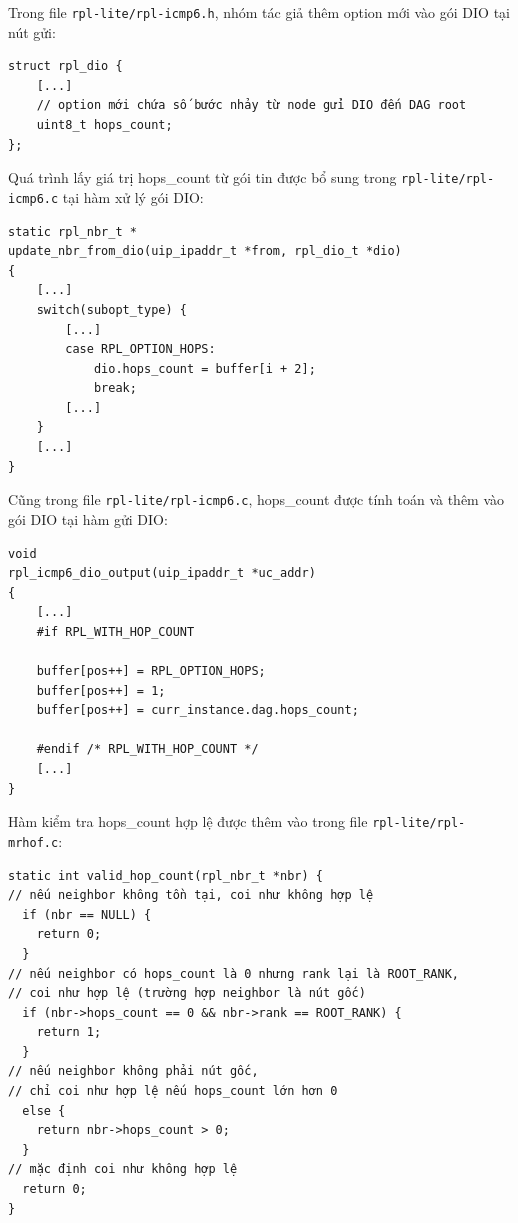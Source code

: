Trong file \texttt{rpl-lite/rpl-icmp6.h}, nhóm tác giả thêm option mới vào gói DIO tại nút gửi:
\begin{verbatim}
struct rpl_dio {
    [...]
    // option mới chứa số bước nhảy từ node gửi DIO đến DAG root
    uint8_t hops_count;
};
\end{verbatim}

Quá trình lấy giá trị hops\_count từ gói tin được bổ sung trong \texttt{rpl-lite/rpl-icmp6.c} tại hàm xử lý gói DIO:
\begin{verbatim}
static rpl_nbr_t *
update_nbr_from_dio(uip_ipaddr_t *from, rpl_dio_t *dio)
{
    [...]
    switch(subopt_type) {
        [...]
        case RPL_OPTION_HOPS:
            dio.hops_count = buffer[i + 2];
            break;
        [...]
    }
    [...]
}
\end{verbatim}

Cũng trong file \texttt{rpl-lite/rpl-icmp6.c}, hops\_count được tính toán và thêm vào gói DIO tại hàm gửi DIO:

\begin{verbatim}
void
rpl_icmp6_dio_output(uip_ipaddr_t *uc_addr)
{
    [...]
    #if RPL_WITH_HOP_COUNT

    buffer[pos++] = RPL_OPTION_HOPS;
    buffer[pos++] = 1;
    buffer[pos++] = curr_instance.dag.hops_count;

    #endif /* RPL_WITH_HOP_COUNT */
    [...]
}
\end{verbatim}

Hàm kiểm tra hops\_count hợp lệ được thêm vào trong file \texttt{rpl-lite/rpl-mrhof.c}:

\begin{verbatim}
static int valid_hop_count(rpl_nbr_t *nbr) {
// nếu neighbor không tồn tại, coi như không hợp lệ
  if (nbr == NULL) {
    return 0;
  }
// nếu neighbor có hops_count là 0 nhưng rank lại là ROOT_RANK,
// coi như hợp lệ (trường hợp neighbor là nút gốc)
  if (nbr->hops_count == 0 && nbr->rank == ROOT_RANK) {
    return 1;
  }
// nếu neighbor không phải nút gốc,
// chỉ coi như hợp lệ nếu hops_count lớn hơn 0
  else {
    return nbr->hops_count > 0;
  }
// mặc định coi như không hợp lệ
  return 0;
}
\end{verbatim}

